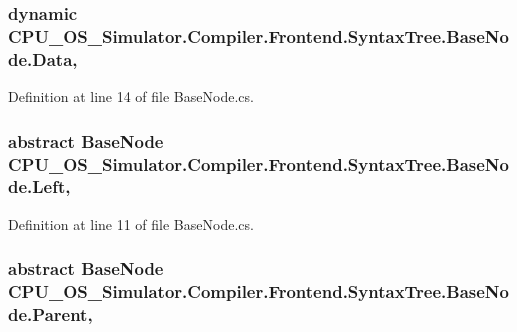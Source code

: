 \subsubsection[{Data}]{\setlength{\rightskip}{0pt plus 5cm}dynamic C\+P\+U\+\_\+\+O\+S\+\_\+\+Simulator.\+Compiler.\+Frontend.\+Syntax\+Tree.\+Base\+Node.\+Data\hspace{0.3cm}{\ttfamily [get]}, {\ttfamily [set]}}\label{class_c_p_u___o_s___simulator_1_1_compiler_1_1_frontend_1_1_syntax_tree_1_1_base_node_ad7f198ee35d784abb122d510ec17c59a}


Definition at line 14 of file Base\+Node.\+cs.

\hypertarget{class_c_p_u___o_s___simulator_1_1_compiler_1_1_frontend_1_1_syntax_tree_1_1_base_node_aff39b054b8bcc205583285c1dccfcbf3}{}
\subsubsection[{Left}]{\setlength{\rightskip}{0pt plus 5cm}abstract {\bf Base\+Node} C\+P\+U\+\_\+\+O\+S\+\_\+\+Simulator.\+Compiler.\+Frontend.\+Syntax\+Tree.\+Base\+Node.\+Left\hspace{0.3cm}{\ttfamily [get]}, {\ttfamily [set]}}\label{class_c_p_u___o_s___simulator_1_1_compiler_1_1_frontend_1_1_syntax_tree_1_1_base_node_aff39b054b8bcc205583285c1dccfcbf3}


Definition at line 11 of file Base\+Node.\+cs.

\hypertarget{class_c_p_u___o_s___simulator_1_1_compiler_1_1_frontend_1_1_syntax_tree_1_1_base_node_a218b40fedda0f7d47f1985f8396a0c48}{}
\subsubsection[{Parent}]{\setlength{\rightskip}{0pt plus 5cm}abstract {\bf Base\+Node} C\+P\+U\+\_\+\+O\+S\+\_\+\+Simulator.\+Compiler.\+Frontend.\+Syntax\+Tree.\+Base\+Node.\+Parent\hspace{0.3cm}{\ttfamily [get]}, {\ttfamily [set]}}\label{class_c_p_u___o_s___simulator_1_1_compiler_1_1_frontend_1_1_syntax_tree_1_1_base_node_a218b40fedda0f7d47f1985f8396a0c48}


